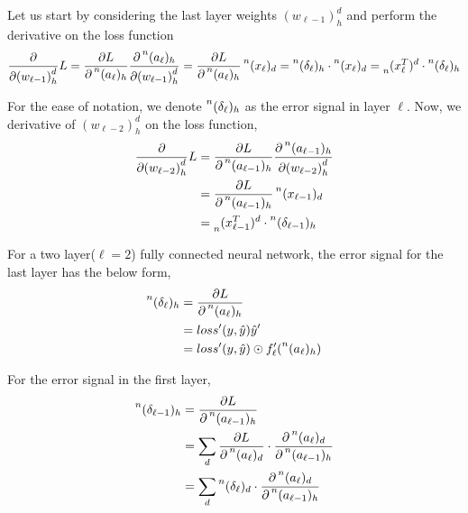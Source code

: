 \documentclass[12pt,a4paper]{article}%
\theoremstyle{definition}
\theoremstyle{plain}
\numberwithin{equation}{section}
\newcounter{subsubsubsection}[subsubsection]
\begin{document}
Let us start by considering the last layer weights ${(w_{\ell-1})}^{d}_{h} $ and perform the derivative on the loss function
\begin{equation}
\frac{\partial}{\partial {(w_{\ell-1})}^{d}_{h}} L = \frac{\partial L}{\partial \prescript{n}{}{(a_{\ell})}_{h}} \frac{\partial \prescript{n}{}{(a_{\ell})}_{h}}{\partial {(w_{\ell-1})}^{d}_{h}} = \frac{\partial L}{\partial \prescript{n}{}{(a_{\ell})}_{h}}  \prescript{n}{}{(x_{\ell})}_{d} =  \prescript{n}{}{(\delta_{\ell})}_{h} \cdot \prescript{n}{}{(x_{\ell})}_{d} = \prescript{}{n}{(x_{\ell}^{T})}^{d} \cdot \prescript{n}{}{(\delta_{\ell})}_{h} 
\end{equation}

For the ease of notation,  we denote  $\prescript{n}{}{(\delta_{\ell})}_{h}$ as the error signal in layer $\ell$. Now, we derivative of ${(w_{\ell-2})}^{d}_{h}$ on the loss function, 
\begin{align}
\frac{\partial}{\partial {(w_{\ell-2})}^{d}_{h}} L  &=  \frac{\partial L}{\partial \prescript{n}{}{(a_{\ell-1})}_{h}} \frac{\partial \prescript{n}{}{(a_{\ell-1})}_{h}}{\partial {(w_{\ell-2})}^{d}_{h}} \\
& = \frac{\partial L}{\partial \prescript{n}{}{(a_{\ell-1})}_{h}}  \prescript{n}{}{(x_{\ell-1})}_{d} \\
& = \prescript{}{n}{(x_{\ell-1}^{T})}^{d} \cdot \prescript{n}{}{(\delta_{\ell-1})}_{h} 
\end{align}


For a two layer($\ell = 2$) fully connected neural network,  the error signal for the last layer has the below form,
\begin{align}
\begin{split}
\prescript{n}{}{(\delta_{\ell})}_{h} &= \frac{\partial L}{\partial \prescript{n}{}{(a_{\ell})}_{h}} \\
															  &= loss'(y,\hat{y}) \hat{y}' \\
															  &= loss'(y,\hat{y}) \odot f'_{\ell}(\prescript{n}{}{(a_{\ell})}_{h})
\end{split}
\end{align}

For the error signal in the first layer,
\begin{align*}
\begin{split}
\prescript{n}{}{(\delta_{\ell-1})}_{h} &= \frac{\partial L}{\partial \prescript{n}{}{(a_{\ell-1})}_{h}} \\
																  &= \sum\limits_{d} \frac{\partial L}{\partial \prescript{n}{}{(a_{\ell})}_{d}} \cdot \frac{\partial \prescript{n}{}{(a_{\ell})}_{d}}{\partial \prescript{n}{}{(a_{\ell-1})}_{h}} \\
														          &= \sum\limits_{d} 	\prescript{n}{}{(\delta_{\ell})}_{d} \cdot \frac{\partial \prescript{n}{}{(a_{\ell})}_{d}}{\partial \prescript{n}{}{(a_{\ell-1})}_{h}}			  
\end{split}
\label{delta1}
\end{align*}
\end{document}
